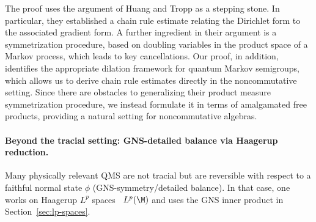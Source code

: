 \documentclass[sn-mathphys-num]{sn-jnl}
\begin{document}
The proof uses the argument of Huang and Tropp as a stepping stone. In particular, they established a chain rule estimate relating the Dirichlet form to the associated gradient form. A further ingredient in their argument is a symmetrization procedure, based on doubling variables in the product space of a Markov process, which leads to key cancellations.
Our proof, in addition, identifies the appropriate dilation framework for quantum Markov semigroups, which allows us to derive chain rule estimates directly in the noncommutative setting. Since there are obstacles to generalizing their product measure symmetrization procedure, we instead formulate it in terms of amalgamated free products, providing a natural setting for noncommutative algebras.


\paragraph{Beyond the tracial setting: GNS-detailed balance via Haagerup reduction.}
Many physically relevant QMS are not tracial but are reversible with respect to a faithful normal state $\phi$ (GNS-symmetry/detailed balance). In that case, one works on Haagerup $L^p$ spaces~\cite{haagerup1979lpspaces} $L^p(\M)$ and uses the GNS inner product in Section~\ref{sec:lp-spaces}.
\end{document}

